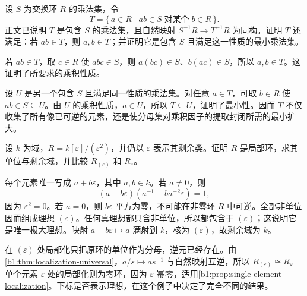 \begin{exercise}\label{b1:ex:13-3}
	设 \(S\) 为交换环 \(R\) 的乘法集，令
	\[
		T=\{\,a\in R\mid ab\in S\;\text{对某个}\;b\in R\,\}.
	\]
	正文已说明 \(T\) 是包含 \(S\) 的乘法集，且自然映射 \(S^{-1}R\rightarrow T^{-1}R\) 为同构。证明 \(T\) 还满足：若 \(ab\in T\)，则 \(a,b\in T\)；并证明它是包含 \(S\) 且满足这一性质的最小乘法集。
\end{exercise}
\begin{solution}
	若 \(ab\in T\)，取 \(c\in R\) 使 \(abc\in S\)，则 \(a(bc)\in S\)、\(b(ac)\in S\)，所以 \(a,b\in T\)。这证明了所要求的乘积性质。

	设 \(U\) 是另一个包含 \(S\) 且满足同一性质的乘法集。对任意 \(a\in T\)，可取 \(b\in R\) 使 \(ab\in S\subseteq U\)。由 \(U\) 的乘积性质，\(a\in U\)，所以 \(T\subseteq U\)，证明了最小性。因而 \(T\) 不仅收集了所有像已可逆的元素，还是使分母集对乘积因子的提取封闭所需的最小扩大。
\end{solution}

\begin{exercise}\label{b1:ex:13-4}
	设 \(k\) 为域，\(R=k[\varepsilon]/(\varepsilon^2)\)，并仍以 \(\varepsilon\) 表示其剩余类。证明 \(R\) 是局部环，求其单位与剩余域，并比较 \(R_{(\varepsilon)}\) 和 \(R_{\varepsilon}\)。
\end{exercise}
\begin{solution}
	每个元素唯一写成 \(a+b\varepsilon\)，其中 \(a,b\in k\)。若 \(a\neq0\)，则
	\[
		(a+b\varepsilon)(a^{-1}-ba^{-2}\varepsilon)=1,
	\]
	因为 \(\varepsilon^2=0\)。若 \(a=0\)，则 \(b\varepsilon\) 平方为零，不可能在非零环 \(R\) 中可逆。全部非单位因而组成理想 \((\varepsilon)\)。任何真理想都只含非单位，所以都包含于 \((\varepsilon)\)；这说明它是唯一极大理想。映射 \(a+b\varepsilon\mapsto a\) 满射到 \(k\)，核为 \((\varepsilon)\)，故剩余域为 \(k\)。

	在 \((\varepsilon)\) 处局部化只把原环的单位作为分母，逆元已经存在。由\cref{b1:thm:localization-universal}，\(a/s\mapsto as^{-1}\) 与自然映射互逆，所以 \(R_{(\varepsilon)}\cong R\)。单个元素 \(\varepsilon\) 处的局部化则为零环，因为 \(\varepsilon\) 幂零，适用\cref{b1:prop:single-element-localization}。下标是否表示理想，在这个例子中决定了完全不同的结果。
\end{solution}


